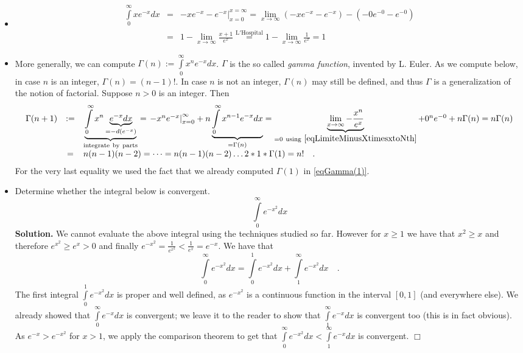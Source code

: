 \documentclass[12pt]{book}
\newenvironment{solution}{\textbf{Solution.} }{$\Box$}
\begin{document}
\begin{itemize}
\item 
\[ 
\begin{array}{rcl}
\int\limits_{0}^{\infty}xe^{-x}dx&=& \left.-xe^{-x} - e^{-x}\right|_{x=0}^{x=\infty}=\lim\limits_{x\to \infty}\left( -xe^{-x} -e^{-x}\right) - (-0e^{-0}-e^{-0})\\&=& 1-\lim \limits_{x\to \infty} \frac{x+1}{e^{x}}\stackrel{\mathrm{L'Hospital}}{=}1-\lim \limits_{x\to \infty} \frac{1}{e^{x}} =1
\end{array}
\]
\item More generally, we can compute $\Gamma (n):=\displaystyle\int\limits_{0}^{\infty} x^ne^{-x}dx$. $\Gamma$ is the so called \emph{gamma function}, invented by L. Euler. As we compute below, in case $n$ is an integer, $\Gamma(n)=(n-1)!$. In case $n$ is not an integer, $\Gamma(n)$ may still be defined, and thus $\Gamma$ is a generalization of the notion of factorial. Suppose $n>0$ is an integer. Then
\[
\begin{array}{rcl}
\Gamma (n+1)&:=&\underbrace{\int\limits_{0}^{\infty} x^{n}\underbrace{e^{-x}dx}_{=-d (e^{-x})}}_{\mathrm{integrate~by~parts}}=\left. -x^{n}e^{-x}\right|_{x=0}^{\infty}+ n\underbrace{\int\limits_{0}^{\infty}x^{n-1} e^{-x}dx}_{=\Gamma(n)}= \underbrace{\lim\limits_{x\to \infty} -\frac{x^{n}}{e^x}}_{=0\mathrm{~using~\eqref{eqLimiteMinusXtimesxtoNth}}}+ 0^ne^{-0}+n\Gamma(n)= n\Gamma(n)\\
&=& n(n-1)(n-2)=\dots =n(n-1)(n-2)\dots 2*1* \Gamma(1)= n!\quad .
\end{array}
\]
For the very last equality we used the fact that we already computed $\Gamma(1)$ in \eqref{eqGamma(1)}.
\item Determine whether the integral below is convergent. 
\[
\int\limits_{0}^{\infty}e^{-x^2}dx
\]
\begin{solution}
We cannot evaluate the above integral using the techniques studied so far. However  for $x\geq 1$ we have that $x^2\geq x$ and therefore $e^{x^2}\geq e^{x}>0$ and finally $e^{-x^2}= \frac{1}{e^{x^2}}<\frac{1}{e^x}= e^{-x}$. We have that 
\[
\int\limits_{0}^{\infty}e^{-x^2}dx= \int\limits_{0}^{1}e^{-x^2}dx +\int\limits_{1}^{\infty}e^{-x^2}dx\quad .
\]
The first integral $\int\limits_{0}^{1}e^{-x^2}dx$ is proper and well defined, as $e^{-x^2}$ is a continuous function in the interval $[0,1]$ (and everywhere else).  We already showed that $ \int\limits_{0}^{\infty}e^{-x}dx$ is convergent; we leave it to the reader to show that $ \int\limits_{1}^{\infty}e^{-x}dx$ is convergent too (this is in fact obvious). As $e^{-x}>e^{-x^2}$ for $x>1$, we apply the comparison theorem to get that $\int\limits_{0}^{\infty}e^{-x^2}dx<\int\limits_{1}^{\infty}e^{-x}dx$ is convergent.
\end{solution}
\end{itemize}
\end{document}
